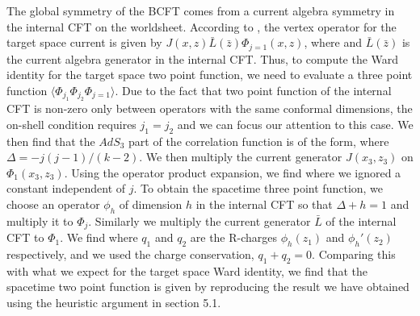 The global symmetry of the BCFT comes from a current
algebra symmetry in the internal CFT on the worldsheet.
According to \gk, the vertex operator for the target
space current is given by $J(x,z) \bar{L}(\bar z)
\Phi_{j=1}(x,z)$, where
\eqn{}
and $\bar{L}(\bar z)$ is the
current algebra generator in the internal CFT.
Thus, to compute the Ward identity for the target
space two point function,
we need to evaluate a three point function
$\langle \Phi_{j_1} \Phi_{j_2} \Phi_{j=1}\rangle$.
Due to the fact that
two point function of the internal CFT is non-zero
only between operators with the same conformal
dimensions, the on-shell condition requires
$j_1=j_2$ and we can focus our attention to this case.
We then find that the $AdS_3$ part
of the correlation function is of the form,
\eqn{}
where $\Delta=-j(j-1)/(k-2)$.
We then multiply the current generator $J(x_3,z_3)$ on
$\Phi_1(x_3,z_3)$. Using the operator product
expansion,
\eqn{}
we find
\eqn{}
where we ignored a constant independent of $j$.
To obtain the spacetime three point function,
we choose an operator $\phi_h$ of dimension $h$
in the internal CFT so that $\Delta + h = 1$
and multiply it to $\Phi_j$. Similarly we
multiply the current generator
$\bar{L}$ of the internal CFT to $\Phi_1$. We find
\eqn{}
where $q_1$ and $q_2$ are the R-charges
$\phi_h(z_1)$ and $\phi_h'(z_2)$ respectively,
and we used the charge conservation,
$q_1 + q_2=0$. Comparing
this with what we expect for the target space Ward identity,
we find that the spacetime
two point function is given by
\eqn{}
reproducing the result we have obtained
using the heuristic argument in section 5.1.

